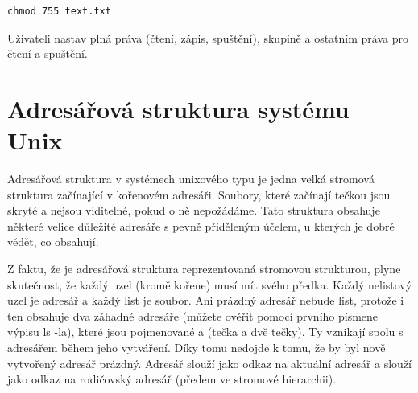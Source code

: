 \documentclass{article}
\begin{document}
\begin{verbatim}
chmod 755 text.txt
\end{verbatim}
Uživateli nastav plná práva (čtení, zápis, spuštění), skupině a ostatním práva pro čtení a spuštění.

\section{Adresářová struktura systému Unix}
Adresářová struktura v systémech unixového typu je jedna velká stromová struktura začínající v kořenovém adresáři. Soubory, které začínají tečkou jsou skryté a nejsou viditelné, pokud o ně nepožádáme. Tato struktura obsahuje některé velice důležité adresáře s pevně přiděleným účelem, u kterých je dobré vědět, co obsahují. 

Z faktu, že je adresářová struktura reprezentovaná stromovou strukturou, plyne skutečnost, že každý uzel (kromě kořene) musí mít svého předka. Každý nelistový uzel je adresář a každý list je soubor. Ani prázdný adresář nebude list, protože i ten obsahuje dva záhadné adresáře (můžete ověřit pomocí prvního písmene výpisu ls -la), které jsou pojmenované  a  (tečka a dvě tečky). Ty vznikají spolu s adresářem během jeho vytváření. Díky tomu nedojde k tomu, že by byl nově vytvořený adresář prázdný. Adresář  slouží jako odkaz na aktuální adresář a  slouží jako odkaz na rodičovský adresář (předem ve stromové hierarchii).
\end{document}
